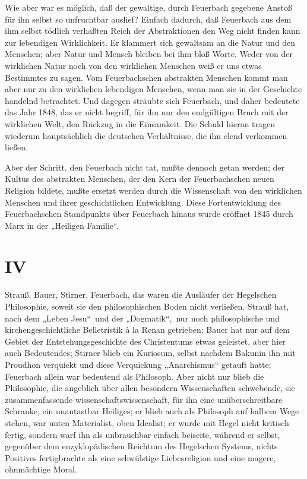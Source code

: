Wie aber war es möglich, daß der gewaltige, durch Feuerbach
gegebene Anstoß für ihn selbst so unfruchtbar auslief? Einfach dadurch,
daß Feuerbach aus dem ihm selbst tödlich verhaßten Reich der
Abstraktionen den Weg nicht finden kann zur lebendigen Wirklichkeit. Er
klammert sich gewaltsam an die Natur und den Menschen; aber Natur und
Mensch bleiben bei ihm bloß Worte. Weder von der wirklichen Natur noch
von den wirklichen Menschen weiß er uns etwas Bestimmtes zu sagen. Vom
Feuerbachschen abstrakten Menschen kommt man aber nur zu den wirklichen
lebendigen Menschen, wenn man sie in der Geschichte handelnd betrachtet.
Und dagegen sträubte sich Feuerbach, und daher bedeutete das Jahr 1848,
das er nicht begriff, für ihn nur den endgültigen Bruch mit der
wirklichen Welt, den Rückzug in die Einsamkeit. Die Schuld hieran tragen
wiederum hauptsächlich die deutschen Verhältnisse, die ihn elend
verkommen ließen.

Aber der Schritt, den Feuerbach nicht tat, mußte dennoch getan
werden; der Kultus des abstrakten Menschen, der den Kern der
Feuerbachschen neuen Religion bildete, mußte ersetzt werden durch die
Wissenschaft von den wirklichen Menschen und ihrer geschichtlichen
Entwicklung. Diese Fortentwicklung des Feuerbachschen Standpunkts über
Feuerbach hinaus wurde eröffnet 1845 durch Marx in der „Heiligen
Familie``.

\quebra

\mbox{}
\vspace{2cm}

\section{IV}


\noindent{}Strauß, Bauer, Stirner, Feuerbach, das waren die Ausläufer der
Hegelschen Philosophie, soweit sie den philosophischen Boden nicht
verließen. Strauß hat, nach dem „Leben Jesu`` \textbar{}\,und der „Dogmatik``,\,\textbar{} nur
noch philosophische und kirchengeschichtliche Belletristik à la Renan
getrieben; Bauer hat nur auf dem Gebiet der Entstehungsgeschichte des
Christentums etwas geleistet, aber hier auch Bedeutendes; Stirner blieb
ein Kuriosum, selbst nachdem Bakunin ihn mit Proudhon verquickt und
diese Verquickung „Anarchismus`` getauft hatte; Feuerbach allein war
bedeutend als Philosoph. Aber nicht nur blieb die Philosophie, die
angeblich über allen besondern Wissenschaften schwebende, sie
zusammenfassende wissenschaftswissenschaft, für ihn eine
unüberschreitbare Schranke, ein unantastbar Heiliges; er blieb auch als
Philosoph auf halbem Wege stehen, war unten Materialist, oben Idealist;
er wurde mit Hegel nicht kritisch fertig, sondern warf ihn als
unbrauchbar einfach beiseite, während er selbst, gegenüber dem
enzyklopädischen Reichtum des Hegelschen Systems, nichts Positives
fertigbrachte als eine schwülstige Liebesreligion und eine magere,
ohnmächtige Moral.

